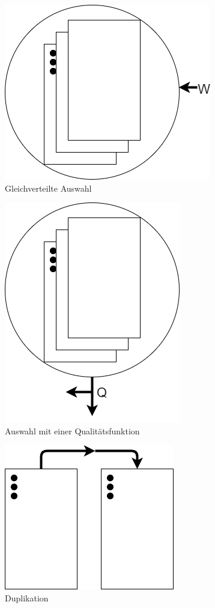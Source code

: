 \begin{figure}[!htb]
	\centering
	\includegraphics[scale=0.5]{img/rechenberg_notation/auswahl_gleichverteilt.png}
	\caption{Gleichverteilte Auswahl}
\label{fig:auswahl_gleichverteilt}
\end{figure}
\begin{figure}[!htb]
	\centering
	\includegraphics[scale=0.5]{img/rechenberg_notation/auswahl_qualitaetsfunktion.png}
	\caption{Auswahl mit einer Qualitätsfunktion}
\label{fig:auswahl_qualitaetsfunktion}
\end{figure}
\begin{figure}[!htb]
	\centering
	\includegraphics[scale=0.5]{img/rechenberg_notation/duplikation.png}
	\caption{Duplikation}
\label{fig:duplikation}
\end{figure}
